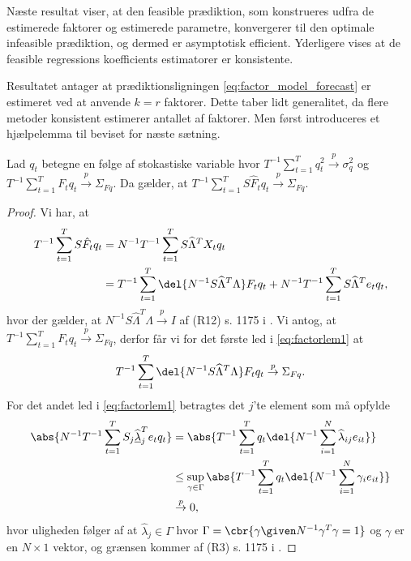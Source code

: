 Næste resultat viser, at den feasible prædiktion, som konstrueres udfra de estimerede faktorer og estimerede parametre, konvergerer til den optimale infeasible prædiktion, og dermed er asymptotisk efficient.
Yderligere vises at de feasible regressions koefficients estimatorer er konsistente.

Resultatet antager at prædiktionsligningen \eqref{eq:factor_model_forecast} er estimeret ved at anvende \(k=r\) faktorer.
Dette taber lidt generalitet, da flere metoder konsistent estimerer antallet af faktorer.
Men først introduceres et hjælpelemma til beviset for næste sætning.
%
\begin{lem} \label{lem:factorlem1}
Lad \(q_t\) betegne en følge af stokastiske variable hvor \(T^{-1} \sum_{t=1}^T q_t^2 \overset{p}{\rightarrow} \sigma_q^2\) og \(T^{-1} \sum_{t=1}^T F_t q_t \overset{p}{\rightarrow} \Sigma_{Fq}\).
Da gælder, at \(T^{-1} \sum_{t=1}^T S \widehat{F}_t q_t \overset{p}{\rightarrow} \Sigma_{Fq}\).
\end{lem}
%
\begin{proof}
Vi har, at
\begin{align}
T^{-1} \sum_{t=1}^T S \hat{F}_t q_t &=N^{-1} T^{-1} \sum_{t=1}^T S \widehat{\Lambda}^T X_t q_t \nonumber \\
&= T^{-1} \sum_{t=1}^T \del{N^{-1} S \widehat{\Lambda}^T \Lambda} F_t q_t + N^{-1} T^{-1} \sum_{t=1}^T S \widehat{\Lambda}^T e_t q_t, \label{eq:factorlem1}
\end{align}
hvor der gælder, at \(N^{-1} S \widehat{\Lambda}^T \Lambda \overset{p}{\rightarrow} I\) af (R12) s. 1175 i \citep{stock_watson_2002a}.
Vi antog, at \(T^{-1} \sum_{t=1}^T F_t q_t \overset{p}{\rightarrow} \Sigma_{Fq}\), derfor får vi for det første led i \eqref{eq:factorlem1} at
\begin{align*}
T^{-1} \sum_{t=1}^T \del{N^{-1} S \widehat{\Lambda}^T \Lambda} F_t q_t \overset{p}{\rightarrow} \Sigma_{Fq}.
\end{align*}
For det andet led i \eqref{eq:factorlem1} betragtes det \(j\)'te element som må opfylde
\begin{align*}
\abs{N^{-1} T^{-1} \sum_{t=1}^T S_j \underline{\widehat{\lambda}}_j^T e_t q_t} &= \abs{T^{-1} \sum_{t=1}^T q_t \del{N^{-1} \sum_{i=1}^N \widehat{\lambda}_{ij} e_{it}}} \\
& \leq \sup_{\gamma \in \Gamma} \abs{T^{-1} \sum_{t=1}^T q_t \del{N^{-1} \sum_{i=1}^N \gamma_i e_{it}}} \\
& \overset{p}{\rightarrow} 0,
\end{align*}
hvor uligheden følger af at \(\widehat{\lambda}_j \in \Gamma\) hvor \(\Gamma = \cbr{\gamma \given N^{-1} \gamma^T \gamma = 1}\) og \(\gamma\) er en \(N \times 1\) vektor, og grænsen kommer af (R3) s. 1175 i \citep{stock_watson_2002a}.
\end{proof}


